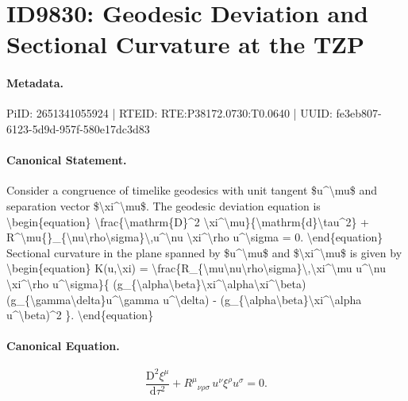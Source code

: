 \section*{ID9830: Geodesic Deviation and Sectional Curvature at the TZP}
\paragraph{Metadata.}
PiID: 2651341055924 | RTEID: RTE:P38172.0730:T0.0640 | UUID: fe3eb807-6123-5d9d-957f-580e17dc3d83

\paragraph{Canonical Statement.}
Consider a congruence of timelike geodesics with unit tangent \$u\textasciicircum{}\textbackslash{}mu\$ and separation vector \$\textbackslash{}xi\textasciicircum{}\textbackslash{}mu\$. The geodesic deviation equation is \textbackslash{}begin\{equation\} \textbackslash{}frac\{\textbackslash{}mathrm\{D\}\textasciicircum{}2 \textbackslash{}xi\textasciicircum{}\textbackslash{}mu\}\{\textbackslash{}mathrm\{d\}\textbackslash{}tau\textasciicircum{}2\} + R\textasciicircum{}\textbackslash{}mu\{\}\_\{\textbackslash{}nu\textbackslash{}rho\textbackslash{}sigma\}\textbackslash{},u\textasciicircum{}\textbackslash{}nu \textbackslash{}xi\textasciicircum{}\textbackslash{}rho u\textasciicircum{}\textbackslash{}sigma = 0. \textbackslash{}end\{equation\} Sectional curvature in the plane spanned by \$u\textasciicircum{}\textbackslash{}mu\$ and \$\textbackslash{}xi\textasciicircum{}\textbackslash{}mu\$ is given by \textbackslash{}begin\{equation\} K(u,\textbackslash{}xi) = \textbackslash{}frac\{R\_\{\textbackslash{}mu\textbackslash{}nu\textbackslash{}rho\textbackslash{}sigma\}\textbackslash{},\textbackslash{}xi\textasciicircum{}\textbackslash{}mu u\textasciicircum{}\textbackslash{}nu \textbackslash{}xi\textasciicircum{}\textbackslash{}rho u\textasciicircum{}\textbackslash{}sigma\}\{ (g\_\{\textbackslash{}alpha\textbackslash{}beta\}\textbackslash{}xi\textasciicircum{}\textbackslash{}alpha\textbackslash{}xi\textasciicircum{}\textbackslash{}beta)(g\_\{\textbackslash{}gamma\textbackslash{}delta\}u\textasciicircum{}\textbackslash{}gamma u\textasciicircum{}\textbackslash{}delta) - (g\_\{\textbackslash{}alpha\textbackslash{}beta\}\textbackslash{}xi\textasciicircum{}\textbackslash{}alpha u\textasciicircum{}\textbackslash{}beta)\textasciicircum{}2 \}. \textbackslash{}end\{equation\}

\paragraph{Canonical Equation.}
\[
\frac{\mathrm{D}^2 \xi^\mu}{\mathrm{d}\tau^2} + R^\mu{}_{\nu\rho\sigma}\,u^\nu \xi^\rho u^\sigma = 0.
\]

